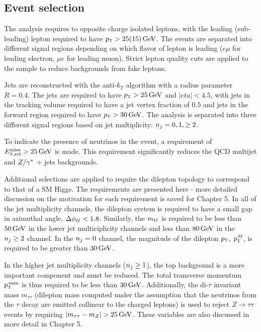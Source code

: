 \subsection{Event selection}

The analysis requires to opposite charge isolated leptons, with the leading (sub-leading) lepton required to have $\pT > 25 (15) \GeV$. The events are separated into different signal regions depending on which flavor of lepton is leading ($e\mu$ for leading electron, $\mu e$ for leading muon). Strict lepton quality cuts are applied to the sample to reduce backgrounds from fake leptons.

Jets are reconstructed with the anti-$k_{T}$ algorithm with a radius parameter $R = 0.4$. The jets are required to have $\pT > 25 \GeV$ and $|eta| < 4.5$, with jets in the tracking volume required to have a jet vertex fraction of $0.5$ and jets in the forward region required to have $\pT > 30 \GeV$. The analysis is separated into three different signal regions based on jet multiplicity: $n_j = 0, 1, \geq 2$. 

To indicate the presence of neutrinos in the event, a requirement of $\METrel > 25 \GeV$ is made. This requirement significantly reduces the QCD multijet and $Z/\gamma^{\ast}$ + jets backgrounds. 

Additional selections are applied to require the dilepton topology to correspond to that of a SM Higgs. The requirements are presented here - more detailed discussion on the motivation for each requirement is saved for Chapter 5. In all of the jet multiplicity channels, the dilepton system is required to have a small gap in azimuthal angle, $\Delta\phi_{\ell\ell} < 1.8$. Similarly, the $m_{\ell\ell}$ is required to be less than $50 \GeV$ in the lower jet multiciplicity channels and less than $80 \GeV$ in the $n_j \geq 2$ channel.  In the $n_j = 0$ channel, the magnitude of the dilepton $p_{\textrm{\footnotesize\sc t}}$, $p_{\textrm{\footnotesize\sc t}}^{\,\ell\ell}$, is required to be greater than $30 \GeV$. 

In the higher jet multiplicity channels ($n_j \geq 1$), the top background is a more important component and must be reduced. The total transverse momentum $p_{\textrm{\footnotesize\sc t}}^{\,\rm sum}$ is thus required to be less than $30 \GeV$. Additionally, the di-$\tau$ invariant mass $m_{\tau\tau}$ (dilepton mass computed under the assumption that the neutrinos from the $\tau$ decay are emitted collinear to the charged leptons) is used to reject $Z\to\tau\tau$ events by requiring $|m_{\tau\tau} - m_{Z}| > 25 \GeV$. These variables are also discussed in more detail in Chapter 5. 

